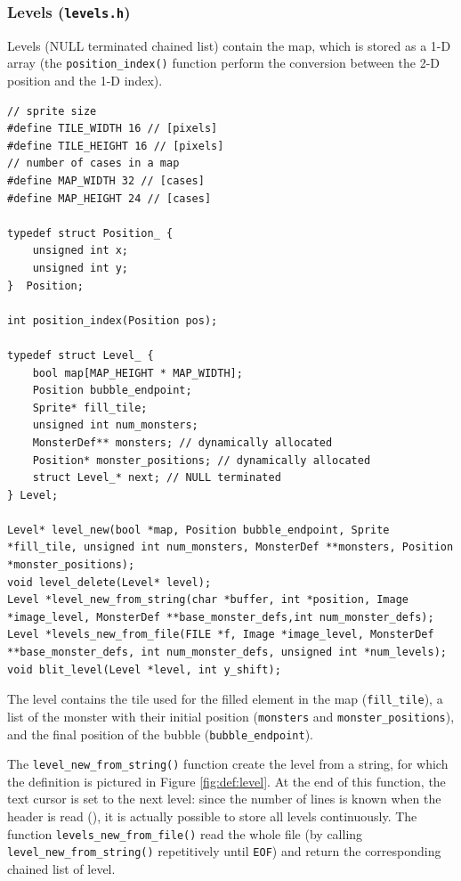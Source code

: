 \documentclass[12pt,a4paper]{article}
\newcommand{\cc}[1]{\texttt{#1}}
\begin{document}
\subsubsection{Levels (\texttt{levels.h})}

Levels (NULL terminated chained list) contain the map, which is stored as a 1-D array (the \cc{position_index()} function perform the conversion between the 2-D position and the 1-D index).

\begin{verbatim}
// sprite size
#define TILE_WIDTH 16 // [pixels]
#define TILE_HEIGHT 16 // [pixels]
// number of cases in a map
#define MAP_WIDTH 32 // [cases]
#define MAP_HEIGHT 24 // [cases]

typedef struct Position_ {
    unsigned int x;
    unsigned int y;
}  Position;

int position_index(Position pos);

typedef struct Level_ {
    bool map[MAP_HEIGHT * MAP_WIDTH];
    Position bubble_endpoint;
    Sprite* fill_tile;
    unsigned int num_monsters;
    MonsterDef** monsters; // dynamically allocated
    Position* monster_positions; // dynamically allocated
    struct Level_* next; // NULL terminated
} Level;

Level* level_new(bool *map, Position bubble_endpoint, Sprite *fill_tile, unsigned int num_monsters, MonsterDef **monsters, Position *monster_positions);
void level_delete(Level* level);
Level *level_new_from_string(char *buffer, int *position, Image *image_level, MonsterDef **base_monster_defs,int num_monster_defs);
Level *levels_new_from_file(FILE *f, Image *image_level, MonsterDef **base_monster_defs, int num_monster_defs, unsigned int *num_levels);
void blit_level(Level *level, int y_shift);
\end{verbatim} 

The level contains the tile used for the filled element in the map (\cc{fill_tile}), a list of the monster with their initial position (\cc{monsters} and \cc{monster_positions}), and the final position of the bubble (\cc{bubble_endpoint}).

The \cc{level_new_from_string()} function create the level from a string, for which the definition is pictured in Figure \ref{fig:def:level}. At the end of this function, the text cursor is set to the next level: since the number of lines is known when the header is read (\text{1 + \cc{num_monster} + 24}), it is actually possible to store all levels continuously. The function \cc{levels_new_from_file()} read the whole file (by calling \cc{level_new_from_string()} repetitively until \cc{EOF}) and return the corresponding chained list of level. 
\end{document}
